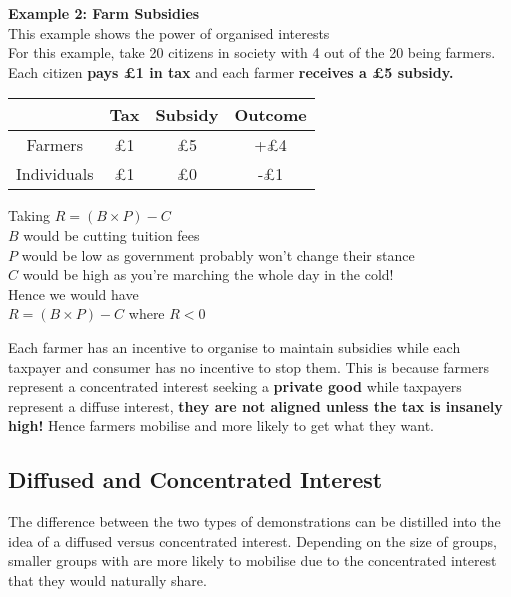 \documentclass[12pt, letterpaper]{article}
\begin{document}
\begin{center}
\textbf{Example 2: Farm Subsidies} \\
This example shows the power of organised interests \\
For this example, take 20 citizens in society with 4 out of the 20 being farmers. Each citizen \textbf{pays £1 in tax} and each farmer \textbf{receives a £5 subsidy.}

\begin{center}
\begin{tabular}{|c|c|c|c|}

	\hline
	& Tax & Subsidy & Outcome \\
	\hline
	\hline
	Farmers & £1 & £5 & +£4 \\
	\hline
	Individuals & £1 & £0 & -£1 \\
	\hline

\end{tabular}
\end{center}

Taking $R=(B \times P) - C$ \\
$B$ would be cutting tuition fees \\
$P$ would be low as government probably won't change their stance \\
$C$ would be high as you're marching the whole day in the cold! \\
Hence we would have \\
$R=(B \times P) - C$ where $R<0$
\end{center}

Each farmer has an incentive to organise to maintain subsidies while each taxpayer and consumer has no incentive to stop them. This is because farmers represent a concentrated interest seeking a \textbf{private good} while taxpayers represent a diffuse interest, \textbf{they are not aligned unless the tax is insanely high!} Hence farmers mobilise and more likely to get what they want.

\subsection{Diffused and Concentrated Interest}
The difference between the two types of demonstrations can be distilled into the idea of a diffused versus concentrated interest. Depending on the size of groups, smaller groups with are more likely to mobilise due to the concentrated interest that they would naturally share.



\newpage
\end{document}
